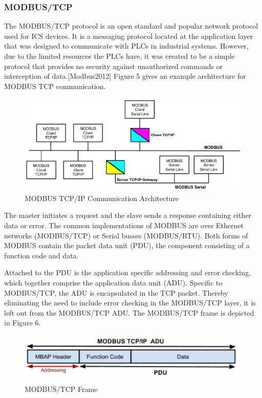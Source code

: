 \documentclass[12pt,]{article}
\begin{document}
\subsubsection{MODBUS/TCP}\label{modbustcp}

The MODBUS/TCP protocol is an open standard and popular network protocol
used for ICS devices. It is a messaging protocol located at the
application layer that was designed to communicate with PLCs in
industrial systems. However, due to the limited resources the PLCs have,
it was created to be a simple protocol that provides no security against
unauthorized commands or interception of data.{[}Modbus2012{]} Figure 5
gives an example architecture for MODBUS TCP communication.

\begin{figure}

{\centering \includegraphics{test2_files/figure-latex/unnamed-chunk-6-1} 

}

\caption{MODBUS TCP/IP Communication Architecture}\label{fig:unnamed-chunk-6}
\end{figure}

The master initiates a request and the slave sends a response containing
either data or error. The common implementations of MODBUS are over
Ethernet networks (MODBUS/TCP) or Serial busses (MODBUS/RTU). Both forms
of MODBUS contain the packet data unit (PDU), the component consisting
of a function code and data.

Attached to the PDU is the application specific addressing and error
checking, which together comprise the application data unit (ADU).
Specific to MODBUS/TCP, the ADU is encapsulated in the TCP packet.
Thereby eliminating the need to include error checking in the MODBUS/TCP
layer, it is left out from the MODBUS/TCP ADU. The MODBUS/TCP frame is
depicted in Figure 6.

\begin{figure}

{\centering \includegraphics{test2_files/figure-latex/unnamed-chunk-7-1} 

}

\caption{MODBUS/TCP Frame}\label{fig:unnamed-chunk-7}
\end{figure}
\end{document}

